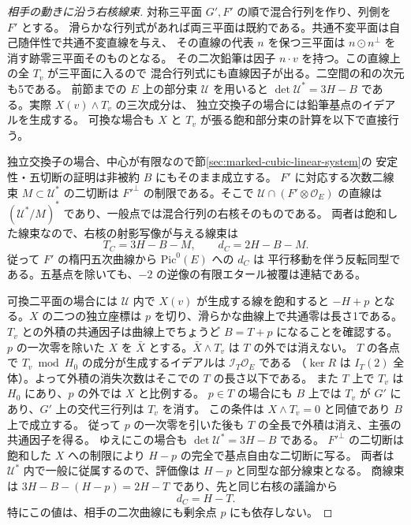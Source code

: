 \begin{proof}[相手の動きに沿う右核線束]
対称三平面 $G',F'$ の順で混合行列を作り、列側を $F'$ とする。
滑らかな行列式があれば両三平面は既約である。共通不変平面は自己随伴性で共通不変直線を与え、
その直線の代表 $n$ を保つ三平面は $n\odot n^\perp$ を消す跡零三平面そのものとなる。
その二次鉛筆は因子 $n\cdot v$ を持つ。この直線上の全 $T_v$ が三平面に入るので
混合行列式にも直線因子が出る。二空間の和の次元も5である。
前節までの $E$ 上の部分束 $\mathcal U$ を用いると
$\det\mathcal U^*=3H-B$ である。実際 $X(v)\wedge T_v$ の三次成分は、
独立交換子の場合には鉛筆基点のイデアルを生成する。
可換な場合も $X$ と $T_v$ が張る飽和部分束の計算を以下で直接行う。

独立交換子の場合、中心が有限なので節\ref{sec:marked-cubic-linear-system}の
安定性・五切断の証明は非被約 $B$ にもそのまま成立する。
$F'$ に対応する次数二線束 $M\subset\mathcal U^*$ の二切断は
$F'^\perp$ の制限である。そこで $\mathcal U\cap(F'\otimes\mathcal O_E)$ の直線は
$(\mathcal U^*/M)^*$ であり、一般点では混合行列の右核そのものである。
両者は飽和した線束なので、右核の射影写像が与える線束は
\[
             T_C=3H-B-M,\qquad d_C=2H-B-M.
\]
従って $F'$ の楕円五次曲線から $\mathrm{Pic}^0(E)$ への $d_C$ は
平行移動を伴う反転同型である。五基点を除いても、$-2$ の逆像の有限エタール被覆は連結である。

可換二平面の場合には $\mathcal U$ 内で $X(v)$ が生成する線を飽和すると
$-H+p$ となる。$X$ の二つの独立座標は $p$ を切り、滑らかな曲線上で共通零は長さ1である。
$T_v$ との外積の共通因子は曲線上でちょうど $B=T+p$ になることを確認する。
$p$ の一次零を除いた $X$ を $\bar X$ とする。$\bar X\wedge T_v$ は $T$ の外では消えない。
$T$ の各点で $T_v\bmod H_0$ の成分が生成するイデアルは $\mathcal I_T\mathcal O_E$ である
（$\ker R$ は $I_T(2)$ 全体）。よって外積の消失次数はそこでの $T$ の長さ以下である。
また $T$ 上で $T_v$ は $H_0$ にあり、$p$ の外では $X$ と比例する。
$p\in T$ の場合にも $B$ 上では $T_v$ が $G'$ にあり、$G'$ 上の交代三行列は $T_v$ を消す。
この条件は $X\wedge T_v=0$ と同値であり $B$ 上で成立する。
従って $p$ の一次零を引いた後も $T$ の全長で外積は消え、主張の共通因子を得る。
ゆえにこの場合も $\det\mathcal U^*=3H-B$ である。
$F'^\perp$ の二切断は飽和した $X$ への制限により $H-p$ の完全で基点自由な二切断に写る。
両者は $\mathcal U^*$ 内で一般に従属するので、評価像は $H-p$ と同型な部分線束となる。
商線束は $3H-B-(H-p)=2H-T$ であり、先と同じ右核の議論から
\[
                         d_C=H-T .
\]
特にこの値は、相手の二次曲線にも剰余点 $p$ にも依存しない。
\end{proof}

